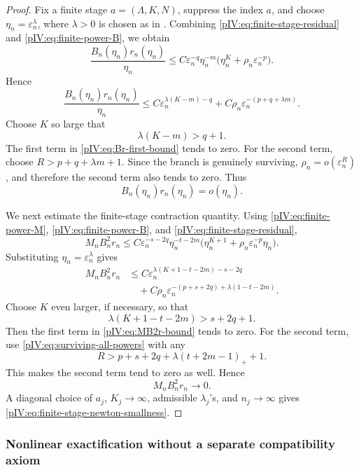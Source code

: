 \documentclass[11pt]{article}
\numberwithin{equation}{section}
\theoremstyle{plain}
\theoremstyle{definition}
\theoremstyle{remark}
\begin{document}
\begin{proof}
Fix a finite stage \(a=(\Lambda,K,N)\), suppress the index \(a\), and choose
\(\eta_n=\varepsilon_n^\lambda\), where \(\lambda>0\) is chosen as in
. Combining
\eqref{pIV:eq:finite-stage-residual} and \eqref{pIV:eq:finite-power-B}, we obtain
\[
        \frac{B_n(\eta_n)r_n(\eta_n)}{\eta_n}
        \le
        C\varepsilon_n^{-q}\eta_n^{-m}
        \bigl(\eta_n^K+\rho_n\varepsilon_n^{-p}\bigr).
\]
Hence
\begin{equation}\label{pIV:eq:Br-first-bound}
        \frac{B_n(\eta_n)r_n(\eta_n)}{\eta_n}
        \le
        C\varepsilon_n^{\lambda(K-m)-q}
        +C\rho_n\varepsilon_n^{-(p+q+\lambda m)}.
\end{equation}
Choose \(K\) so large that
\[
        \lambda(K-m)>q+1.
\]
The first term in \eqref{pIV:eq:Br-first-bound} tends to zero. For the second term,
choose \(R>p+q+\lambda m+1\). Since the branch is genuinely surviving,
\(\rho_n=o(\varepsilon_n^R)\), and therefore the second term also tends to zero.
Thus
\[
        B_n(\eta_n)r_n(\eta_n)=o(\eta_n).
\]

We next estimate the finite-stage contraction quantity. Using
\eqref{pIV:eq:finite-power-M}, \eqref{pIV:eq:finite-power-B}, and
\eqref{pIV:eq:finite-stage-residual},
\[
        M_nB_n^2r_n
        \le
        C\varepsilon_n^{-s-2q}\eta_n^{-t-2m}
        \bigl(\eta_n^{K+1}+\rho_n\varepsilon_n^{-p}\eta_n\bigr).
\]
Substituting \(\eta_n=\varepsilon_n^\lambda\) gives
\begin{align}
        M_nB_n^2r_n
        &\le
        C\varepsilon_n^{\lambda(K+1-t-2m)-s-2q}
        \nonumber\\
        &\quad+
        C\rho_n
        \varepsilon_n^{-(p+s+2q)+\lambda(1-t-2m)} .
        \label{pIV:eq:MB2r-bound}
\end{align}
Choose \(K\) even larger, if necessary, so that
\[
        \lambda(K+1-t-2m)>s+2q+1.
\]
Then the first term in \eqref{pIV:eq:MB2r-bound} tends to zero. For the second term, use
\eqref{pIV:eq:surviving-all-powers} with any
\[
        R>p+s+2q+\lambda(t+2m-1)_+ +1.
\]
This makes the second term tend to zero as well. Hence
\[
        M_nB_n^2r_n\to0.
\]
A diagonal choice of \(a_j\), \(K_j\to\infty\), admissible \(\lambda_j\)'s, and
\(n_j\to\infty\) gives \eqref{pIV:eq:finite-stage-newton-smallness}.
\end{proof}

\subsubsection{Nonlinear exactification without a separate compatibility axiom}
\end{document}
